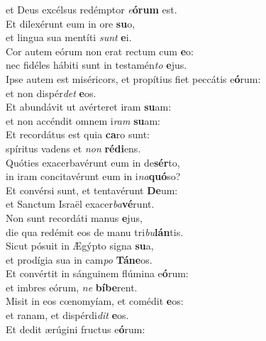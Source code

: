 \oddverse et Deus excélsus redémptor \textit{e}\textbf{ó}\textbf{rum} est.\\
\evenverse Et dilexérunt eum in ore \textbf{su}o,~\*\\
\evenverse et lingua sua mentíti \textit{sunt} \textbf{e}i.\\
\oddverse Cor autem eórum non erat rectum cum \textbf{e}o:~\*\\
\oddverse nec fidéles hábiti sunt in testamén\textit{to} \textbf{e}jus.\\
\evenverse Ipse autem est miséricors, et propítius fiet peccátis e\textbf{ó}rum:~\*\\
\evenverse et non dispér\textit{det} \textbf{e}os.\\
\oddverse Et abundávit ut avérteret iram \textbf{su}am:~\*\\
\oddverse et non accéndit omnem i\textit{ram} \textbf{su}am:\\
\evenverse Et recordátus est quia \textbf{ca}ro sunt:~\*\\
\evenverse spíritus vadens et \textit{non} \textbf{ré}\textbf{di}ens.\\
\oddverse Quóties exacerbavérunt eum in de\textbf{sér}to,~\*\\
\oddverse in iram concitavérunt eum in i\textit{na}\textbf{quó}so?\\
\evenverse Et convérsi sunt, et tentavérunt \textbf{De}um:~\*\\
\evenverse et Sanctum Israël exacer\textit{ba}\textbf{vé}runt.\\
\oddverse Non sunt recordáti manus \textbf{e}jus,~\*\\
\oddverse die qua redémit eos de manu tri\textit{bu}\textbf{lán}tis.\\
\evenverse Sicut pósuit in Ægýpto signa \textbf{su}a,~\*\\
\evenverse et prodígia sua in cam\textit{po} \textbf{Tá}\textbf{ne}os.\\
\oddverse Et convértit in sánguinem flúmina e\textbf{ó}rum:~\*\\
\oddverse et imbres eórum, \textit{ne} \textbf{bí}\textbf{be}rent.\\
\evenverse Misit in eos cœnomyíam, et comédit \textbf{e}os:~\*\\
\evenverse et ranam, et dispérdi\textit{dit} \textbf{e}os.\\
\oddverse Et dedit ærúgini fructus e\textbf{ó}rum:~\*\\
